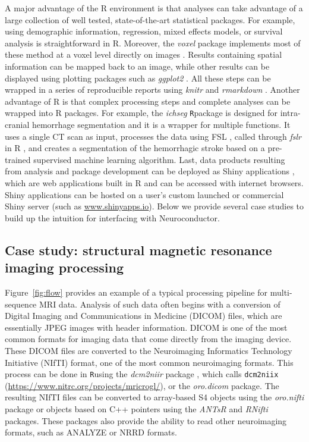 \documentclass[]{elsarticle} %
\newcommand{\pkg}[1]{\emph{#1}}
\newcommand{\rlang}{\texttt{R}}
\begin{document}
A major advantage of the R environment is that analyses can take advantage of a large collection of well tested,  state-of-the-art statistical packages. For example, using demographic information, regression, mixed effects models, or survival analysis is straightforward in R.  Moreover, the \pkg{voxel} package implements most of these method at a voxel level directly on images \citep{voxel}.  Results containing spatial information can be mapped back to an image, while other results can be displayed using plotting packages such as \pkg{ggplot2} \citep{ggplot2}.  All these steps can be wrapped in a series of reproducible reports using \pkg{knitr} and \pkg{rmarkdown} \citep{rmarkdown,knitr}. Another advantage of R is that complex processing steps and complete analyses can be wrapped into R packages. For example, the \pkg{ichseg} \cite{ichseg,muschelli2016pitch} \rlang package is designed for intra-cranial hemorrhage segmentation and it is a wrapper for multiple functions. It uses a  single CT scan as input, processes the data using FSL \citep{fsl}, called through \pkg{fslr} in R \citep{fslr}, and creates a segmentation of the hemorrhagic stroke based on a pre-trained supervised machine learning algorithm. Last, data products resulting from analysis and package development can be deployed as Shiny applications \citep{shiny}, which are web applications built in R and can be accessed with internet browsers.  Shiny applications can be hosted on a user's custom launched or commercial Shiny server (such as \url{www.shinyapps.io}). Below we provide several case studies to build up the intuition for interfacing with  Neuroconductor.

\subsection{Case study: structural magnetic resonance imaging processing} Figure~\ref{fig:flow} provides an example of a typical processing pipeline for multi-sequence MRI data. Analysis of such data often begins with a conversion of Digital Imaging and Communications in Medicine (DICOM) files, which are essentially JPEG images with header information.  DICOM is one of the most common formats for imaging data that come directly from the imaging device.  These DICOM files are converted to the Neuroimaging Informatics Technology Initiative (NIfTI) format, one of the most common neuroimaging formats. This process can be done in \rlang using the \pkg{dcm2niir} package \citep{dcm2niir}, which calls \texttt{dcm2niix} (\url{https://www.nitrc.org/projects/mricrogl/}), or the \pkg{oro.dicom} \cite{oro.nifti} package. The resulting NIfTI files can be converted to array-based S4 objects  using the \pkg{oro.nifti} \cite{oro.nifti} package or objects based on C++ pointers using the \pkg{ANTsR} \cite{antsr} and \pkg{RNifti} \cite{Rnifti} packages.  These packages also provide the ability to read other neuroimaging formats, such as ANALYZE or NRRD formats.
 
\end{document}
